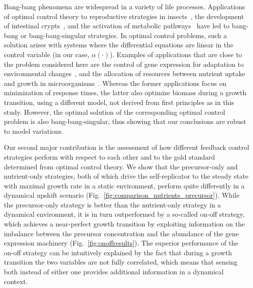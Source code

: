 Bang-bang phenomena are widespread in a variety of life processes.
Applications of optimal control theory to reproductive strategies in insects~\cite{macevicz_modeling_1976}, the development of intestinal crypts~\cite{itzkovitz_optimality_2012}, and the activation of metabolic pathways~\cite{bartl_modelling_2010,oyarzun_sequential_2009} have led to bang-bang or bang-bang-singular strategies.
In optimal control problems, such a solution arises with systems where the differential equations are linear in the control variable (in our case, $\alpha (\cdot)$).
Examples of applications that are close to the problem considered here are the control of gene expression for adaptation to environmental changes~\cite{pavlov_optimal_2013, madar_promoter_2013}, and the allocation of resources between nutrient uptake and growth in microorganisms~\cite{vandenberg_optimal_1998, kiselev_resource_2009}.
Whereas the former applications focus on minimization of response times, the latter also optimize biomass during a growth transition, using a different model, not derived from first principles as in this study.
However, the optimal solution of the corresponding optimal control problem is also bang-bang-singular, thus showing that our conclusions are robust to model variations.

Our second major contribution is the assessment of how different feedback control strategies perform with respect to each other and to the gold standard determined from optimal control theory.
We show that the precursor-only and nutrient-only strategies, both of which drive the self-replicator to the steady state with maximal growth rate in a static environment, perform quite differently in a dynamical upshift scenario (Fig.~\ref{fig:comparison_nutrients_precursor}).
While the precursor-only strategy is better than the nutrient-only strategy in a dynamical environment, it is in turn outperformed by a so-called on-off strategy, which achieves a near-perfect growth transition by exploiting information on the imbalance between the precursor concentration and the abundance of the gene expression machinery (Fig.~\ref{fig:onoffresults}).
The superior performance of the on-off strategy can be intuitively explained by the fact that during a growth transition the two variables are not fully correlated, which means that sensing both instead of either one provides additional information in a dynamical context.

